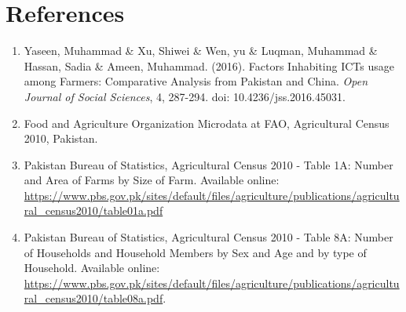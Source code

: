 \documentclass[12pt]{article}
\begin{document}
\newpage
\section*{References}
\begin{enumerate}
    \item Yaseen, Muhammad \& Xu, Shiwei \& Wen, yu \& Luqman, Muhammad \& Hassan, Sadia \& Ameen, Muhammad. (2016). Factors Inhabiting ICTs usage among Farmers: Comparative Analysis from Pakistan and China. \textit{Open Journal of Social Sciences}, 4, 287-294. doi: 10.4236/jss.2016.45031.
    \item Food and Agriculture Organization Microdata at FAO, Agricultural Census 2010, Pakistan.
    \item Pakistan Bureau of Statistics, Agricultural Census 2010 - Table 1A: Number and Area of Farms by Size of Farm. Available online: \url{https://www.pbs.gov.pk/sites/default/files/agriculture/publications/agricultural_census2010/table01a.pdf}
    \item Pakistan Bureau of Statistics, Agricultural Census 2010 - Table 8A: Number of Households and Household Members by Sex and Age and by type of Household. Available online: \url{https://www.pbs.gov.pk/sites/default/files/agriculture/publications/agricultural_census2010/table08a.pdf}.
\end{enumerate}
\end{document}

